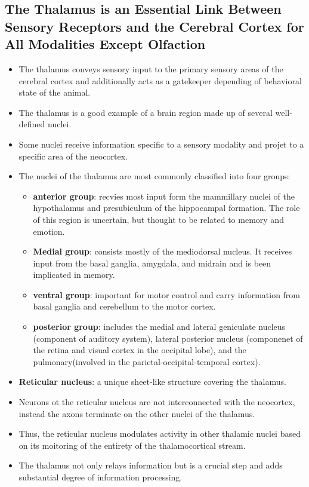 \documentclass[12pt,a4paper]{article}
\begin{document}
\subsection{The Thalamus is an Essential Link Between Sensory Receptors and the Cerebral Cortex for All Modalities Except Olfaction}
\begin{itemize}
    \item The thalamus conveys sensory input to the primary sensory areas of the cerebral cortex and additionally acts as a gatekeeper depending of behavioral state of the animal.
    \item The thalamus is a good example of a brain region made up of several well-defined nuclei.
    \item Some nuclei receive information specific to a sensory modality and projet to a specific area of the neocortex.
    \item The nuclei of the thalamus are most commonly classified into four groups:
        \begin{itemize}
            \item \textbf{anterior group}: recvies most input form the mammillary nuclei of the hypothalamus and presubiculum of the hippocampal formation. The role of this region is uncertain, but thought to be related to memory and emotion.
            \item \textbf{Medial group}: consists mostly of the mediodorsal nucleus. It receives input from the basal ganglia, amygdala, and midrain and is been implicated in memory.
            \item \textbf{ventral group}: important for motor control and carry information from basal ganglia and cerebellum to the motor cortex.
            \item \textbf{posterior group}: includes the medial and lateral geniculate nucleus (component of auditory system), lateral posterior nucleus (componenet of the retina and visual cortex in the occipital lobe), and the pulmonary(involved in the parietal-occipital-temporal cortex).
        \end{itemize}
    \item \textbf{Reticular nucleus}: a unique sheet-like structure covering the thalamus.
    \item Neurons ot the reticular nucleus are not interconnected with the neocortex, instead the axons terminate on the other nuclei of the thalamus.
    \item Thus, the reticular nucleus modulates activity in other thalamic nuclei based on its moitoring of the entirety of the thalamocortical stream.
    \item The thalamus not only relays information but is a crucial step and adds substantial degree of information processing.
\end{itemize}
\end{document}
